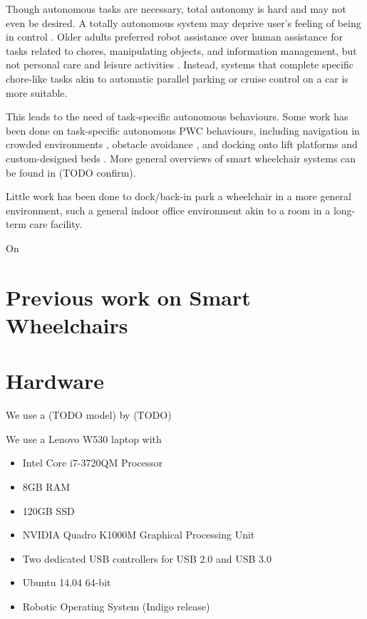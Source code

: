 Though autonomous tasks are necessary, total autonomy is hard and may not even be desired. 
A totally autonomous system may deprive user's feeling of being in control 
\cite{viswanathana2014wizard}.
Older adults preferred robot assistance over human assistance for tasks related
to chores, manipulating objects, and information management, but not personal
care and leisure activities \cite{smarr2014domestic}.
Instead, systems that complete specific chore-like tasks akin to automatic
parallel parking or cruise control on a car is more suitable.

This leads to the need of task-specific autonomous behaviours.
Some work has been done on task-specific autonomous PWC behaviours, including
navigation in crowded environments \cite{prassler2001robotics}, obstacle
avoidance \cite{viswanathan2012navigation}, and docking onto lift platforms
\cite{sermeno2006vision} and custom-designed beds \cite{ren2012docking}.
More general overviews of smart wheelchair systems can be found in
\cite{viswanathan2012navigation, simpson2005smart, faria2013patient} (TODO
confirm).

Little work has been done to dock/back-in park a wheelchair in a more general
environment, such a general indoor office environment akin to a room in a
long-term care facility. 



On


\section{Previous work on Smart Wheelchairs}

\section{Hardware}
We use a (TODO model) by (TODO) 

We use a Lenovo W530 laptop with 
\begin{itemize}
\item Intel Core i7-3720QM Processor
\item 8GB RAM
\item 120GB SSD
\item NVIDIA Quadro K1000M Graphical Processing Unit
\item Two dedicated USB controllers for USB 2.0 and USB 3.0
\item Ubuntu 14.04 64-bit
\item Robotic Operating System (Indigo release)
\end{itemize}

